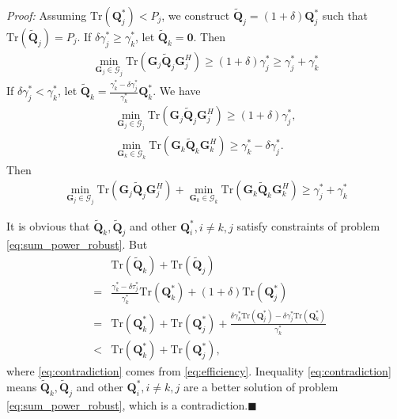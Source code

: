 \documentclass[journal]{IEEEtran}
\begin{document}
\emph{Proof:} Assuming $\mathrm{Tr}(\mathbf{Q}_j^*) < P_j$, we construct $\tilde{\mathbf{Q}}_j = (1 + \delta) \mathbf{Q}_j^*$ such that $\mathrm{Tr}(\tilde{\mathbf{Q}}_j) = P_j$. If $\delta\gamma_j^* \geq \gamma_k^*$, let $\tilde{\mathbf{Q}}_k = \mathbf{0}$. Then
\begin{eqnarray}
\min_{\mathbf{G}_j \in \mathcal{G}_j}\text{Tr}\left(\mathbf{G}_j\tilde{\mathbf{Q}}_j\mathbf{G}_j^H\right) \geq (1+ \delta)\gamma_j^* \geq \gamma_j^* + \gamma_k^*
\end{eqnarray}
If $\delta\gamma_j^* < \gamma_k^*$, let $\tilde{\mathbf{Q}}_k = \frac{\gamma_k^* - \delta\gamma_j^*}{\gamma_k^*} \mathbf{Q}_k^*$. We have
\begin{eqnarray}
\min_{\mathbf{G}_j \in \mathcal{G}_j}\text{Tr}\left(\mathbf{G}_j\tilde{\mathbf{Q}}_j\mathbf{G}_j^H\right) \geq (1+ \delta)\gamma_j^*,\\
\min_{\mathbf{G}_k \in \mathcal{G}_k}\text{Tr}\left(\mathbf{G}_k\tilde{\mathbf{Q}}_k\mathbf{G}_k^H\right) \geq \gamma_k^* - \delta\gamma_j^*.
\end{eqnarray}
Then 
\begin{eqnarray}
\min_{\mathbf{G}_j \in \mathcal{G}_j}\text{Tr}\left(\mathbf{G}_j\tilde{\mathbf{Q}}_j\mathbf{G}_j^H\right) + \min_{\mathbf{G}_k \in \mathcal{G}_k}\text{Tr}\left(\mathbf{G}_k\tilde{\mathbf{Q}}_k\mathbf{G}_k^H\right) \geq \gamma_j^*+\gamma_k^* \nonumber
\end{eqnarray}

It is obvious that $\tilde{\mathbf{Q}}_k, \tilde{\mathbf{Q}}_j$ and other $\mathbf{Q}_i^*, i \neq k,j$ satisfy constraints of problem \eqref{eq:sum_power_robust}. But
\begin{eqnarray}
&&\mathrm{Tr}(\tilde{\mathbf{Q}}_k) + \mathrm{Tr}(\tilde{\mathbf{Q}}_j)\\
&=&\frac{\gamma_k^* - \delta\tau_j^*}{\gamma_k^*} \mathrm{Tr}(\mathbf{Q}_k^*)  + (1 + \delta)\mathrm{Tr}(\mathbf{Q}_j^*)\\
&=&\mathrm{Tr}(\mathbf{Q}_k^*) + \mathrm{Tr}(\mathbf{Q}_j^*) + \frac{\delta\gamma_k^*\mathrm{Tr}(\mathbf{Q}_j^*)-\delta\gamma_j^*\mathrm{Tr}(\mathbf{Q}_k^*)}{\gamma_k^*}\\
&<&\mathrm{Tr}(\mathbf{Q}_k^*) + \mathrm{Tr}(\mathbf{Q}_j^*), \label{eq:contradiction}
\end{eqnarray}
where \eqref{eq:contradiction} comes from  \eqref{eq:efficiency}.
Inequality \eqref{eq:contradiction} means $\tilde{\mathbf{Q}}_k, \tilde{\mathbf{Q}}_j$ and other $\mathbf{Q}_i^*, i \neq k,j$ are a better solution of problem \eqref{eq:sum_power_robust}, which is a contradiction.$\blacksquare$
\end{document}
